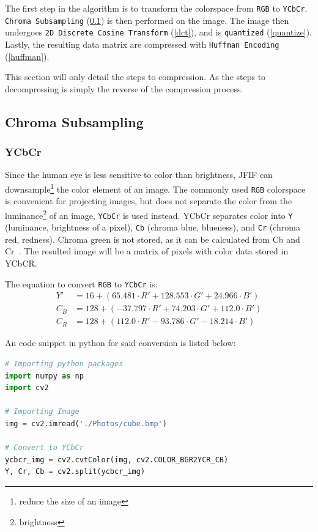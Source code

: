 \documentclass{article}
\begin{document}
The first step in the algorithm is to transform the colorspace from \texttt{RGB} to \texttt{YCbCr}.
\texttt{Chroma Subsampling} (\ref{chroma}) is then performed on the image.
The image then undergoes \texttt{2D Discrete Cosine Transform} (\ref{dct}), and is \texttt{quantized} (\ref{quantize}).
Lastly, the resulting data matrix are compressed with \texttt{Huffman Encoding} (\ref{huffman}).

This section will only detail the steps to compression.
As the steps to decompressing is simply the reverse of the compression process.

\subsection{Chroma Subsampling}\label{chroma}

\subsubsection{YCbCr}
Since the human eye is less sensitive to color than brightness, JFIF can downsample\footnote{reduce the size of an image} the color element of an image.
The commonly used \texttt{RGB} colorspace is convenient for projecting images, but does not separate the color from the luminance\footnote{brightness} of an image, \texttt{YCbCr} is used instead.
YCbCr separates color into \texttt{Y} (luminance, brightness of a pixel), \texttt{Cb} (chroma blue, blueness), and \texttt{Cr} (chroma red, redness).
Chroma green is not stored, as it can be calculated from Cb and Cr~\autocite{ycbcrMedia}.
The resulted image will be a matrix of pixels with color data stored in YCbCR.

The equation to convert \texttt{RGB} to \texttt{YCbCr} is:
\begin{align}
	Y'  &= 16  + (65.481 \cdot R' + 128.553\cdot G' + 24.966 \cdot B') \\
	C_B &= 128 + (-37.797 \cdot R' + 74.203 \cdot G' + 112.0 \cdot B') \\
	C_R &= 128 + (112.0 \cdot R' - 93.786 \cdot G' - 18.214 \cdot B')
\end{align} 

An code snippet in python for said conversion is listed below:
\begin{lstlisting}[language=Python]
# Importing python packages
import numpy as np
import cv2

# Importing Image
img = cv2.imread('./Photos/cube.bmp')

# Convert to YCbCr
ycbcr_img = cv2.cvtColor(img, cv2.COLOR_BGR2YCR_CB)
Y, Cr, Cb = cv2.split(ycbcr_img)
\end{lstlisting}
\end{document}
